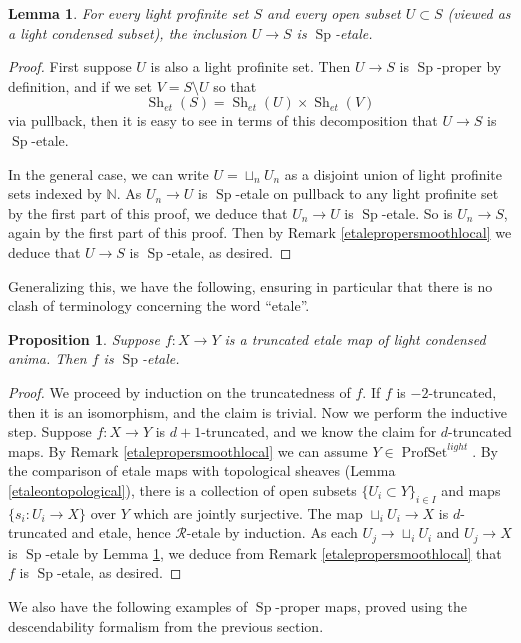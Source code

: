 \documentclass[12pt]{article}
\newtheorem{lemma}[theorem]{Lemma}
\newtheorem{proposition}[theorem]{Proposition}
\newcommand{\on}{\operatorname}
\begin{document}
\begin{lemma}\label{openisetale}
For every light profinite set $S$ and every open subset $U\subset S$ (viewed as a light condensed subset), the inclusion $U\to S$ is $\on{Sp}$-etale.
\end{lemma}
\begin{proof}
First suppose $U$ is also a light profinite set.  Then $U\to S$ is $\on{Sp}$-proper by definition, and if we set $V=S \setminus U$ so that $$\on{Sh}_{et}(S) = \on{Sh}_{et}(U)\times\on{Sh}_{et}(V)$$ via pullback, then it is easy to see in terms of this decomposition that $U\to S$ is $\on{Sp}$-etale.

In the general case, we can write $U=\sqcup_n U_n$ as a disjoint union of light profinite sets indexed by $\mathbb{N}$.  As $U_n\to U$ is $\on{Sp}$-etale on pullback to any light profinite set by the first part of this proof, we deduce that $U_n\to U$ is $\on{Sp}$-etale.  So is $U_n\to S$, again by the first part of this proof. Then by Remark \ref{etalepropersmoothlocal} we deduce that $U\to S$ is $\on{Sp}$-etale, as desired.
\end{proof}

Generalizing this, we have the following, ensuring in particular that there is no clash of terminology concerning the word ``etale''.

\begin{proposition}\label{etaleisetale}
Suppose $f:X\to Y$ is a truncated etale map of light condensed anima.  Then $f$ is $\on{Sp}$-etale.
\end{proposition}
\begin{proof}
We proceed by induction on the truncatedness of $f$.  If $f$ is $-2$-truncated, then it is an isomorphism, and the claim is trivial.  Now we perform the inductive step.  Suppose $f:X\to Y$ is $d+1$-truncated, and we know the claim for $d$-truncated maps.  By Remark \ref{etalepropersmoothlocal} we can assume $Y\in\on{ProfSet}^{light}$.  By the comparison of etale maps with topological sheaves (Lemma \ref{etaleontopological}), there is a collection of open subsets $\{U_i\subset Y\}_{i\in I}$ and maps $\{s_i:U_i\to X\}$ over $Y$ which are jointly surjective.  The map $\sqcup_i U_i\to X$ is $d$-truncated and etale, hence $\mathcal{R}$-etale by induction. As each $U_j\to \sqcup_i U_i$ and $U_j \to X$ is $\on{Sp}$-etale by Lemma \ref{openisetale}, we deduce from Remark \ref{etalepropersmoothlocal} that $f$ is $\on{Sp}$-etale, as desired.
\end{proof}

We also have the following examples of $\on{Sp}$-proper maps, proved using the descendability formalism from the previous section.
\end{document}
